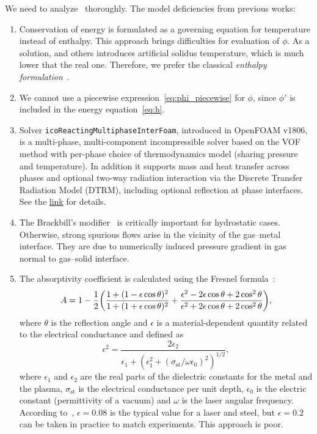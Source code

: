 \documentclass[final]{elsarticle} %
\newcommand{\OpenFOAM}{OpenFOAM\textregistered\xspace}
\begin{document}
We need to analyze~\cite{cook2019simulation} thoroughly.
The model deficiencies from previous works:
\begin{enumerate}
    \item Conservation of energy is formulated as a governing equation for temperature instead of enthalpy.
    This approach brings difficulties for evaluation of $\phi$.
    As a solution, \citet{wang2019powder} and others introduces artificial solidus temperature,
    which is much lower that the real one.
    Therefore, we prefer the classical \emph{enthalpy formulation}~\cite{fedorenko1975difference}.
    \item We cannot use a piecewise expression~\eqref{eq:phi_piecewise} for $\phi$, since $\phi'$ is included in the energy equation~\eqref{eq:h}.
    \item Solver \texttt{icoReactingMultiphaseInterFoam}, introduced in
    \OpenFOAM v1806, is a multi-phase, multi-component incompressible solver based on the VOF method with per-phase choice of thermodynamics model (sharing pressure and temperature). In addition it supports mass and heat transfer across phases and optional two-way radiation interaction via the Discrete Transfer Radiation Model (DTRM), including optional reflection at phase interfaces.
    See the \href{https://www.openfoam.com/releases/openfoam-v1806/solver-and-physics.php}{link} for details.
    \item The Brackbill's modifier~\cite{brackbill1992continuum} is critically important
    for hydrostatic cases.
    Otherwise, strong spurious flows arise in the vicinity of the gas--metal interface.
    They are due to numerically induced pressure gradient in gas normal to gas--solid interface.
    \item The absorptivity coefficient is calculated using the Fresnel formula~\cite{schulz1987laser}:
    \begin{equation*}
        A = 1 - \frac12\qty(
            \frac{1+(1-\epsilon\cos\theta)^2}{1+(1+\epsilon\cos\theta)^2}
          + \frac{\epsilon^2-2\epsilon\cos\theta+2\cos^2\theta}{\epsilon^2+2\epsilon\cos\theta+2\cos^2\theta}
        ),
    \end{equation*}
    where $\theta$ is the reflection angle and
    $\epsilon$ is a material-dependent quantity related to the electrical conductance
    and defined as
    \begin{equation*}
        \epsilon^2 = \frac{2\epsilon_2}{\epsilon_1 + (\epsilon_1^2
            + (\sigma_\text{st}/\omega\epsilon_0)^2)^{1/2}},
    \end{equation*}
    where $\epsilon_1$ and $\epsilon_2$ are the real parts of the dielectric constants
    for the metal and the plasma,
    $\sigma_\text{st}$ is the electrical conductance per unit depth,
    $\epsilon_0$ is the electric constant (permittivity of a vacuum)
    and $\omega$ is the laser angular frequency.
    According to~\cite{ducharme1994laser},
    $\epsilon=0.08$ is the typical value for a  laser and steel,
    but $\epsilon=0.2$ can be taken in practice to match experiments.
    This approach is poor.
\end{enumerate}
\end{document}
